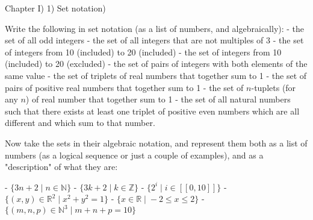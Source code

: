 
Chapter I) 1) Set notation)

Write the following in set notation (as a list of numbers, and algebraically):
- the set of all odd integers
- the set of all integers that are not multiples of 3
- the set of integers from 10 (included) to 20 (included)
- the set of integers from 10 (included) to 20 (excluded)
- the set of pairs of integers with both elements of the same value
- the set of triplets of real numbers that together sum to 1
- the set of pairs of positive real numbers that together sum to 1
- the set of $n$-tuplets (for any $n$) of real number that together sum to 1
- the set of all natural numbers such that there exists at least one triplet of positive even numbers which are all different and which sum to that number.

Now take the sets in their algebraic notation, and represent them both as a list of numbers (as a logical sequence or just a couple of examples), and as a "description" of what they are:

 - $\{3n + 2 \; | \; n \in \mathbb{N} \}$
 - $\{3k + 2 \; | \; k \in \mathbb{Z} \}$
 - $\{ 2^i \; | \; i \in [[0, 10]] \}$
 - $\{ (x, y) \in \mathbb{R}^2 \; | \; x^2 + y^2 = 1 \}$
 - $\{ x \in \mathbb{R} \; | \; -2 \leq x \leq 2 \}$
 - $\{ (m, n, p) \in \mathbb{N}^3 \; | \; m + n + p = 10 \}$
